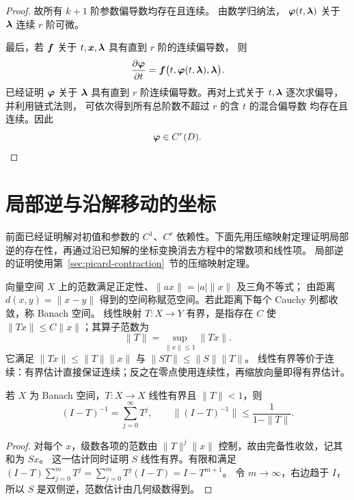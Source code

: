 \begin{proof}
	故所有 $k+1$ 阶参数偏导数均存在且连续。
	由数学归纳法，
	$\boldsymbol{\varphi}(t,\boldsymbol{\lambda})$ 关于
	$\boldsymbol{\lambda}$ 连续 $r$ 阶可微。
	
	最后，若 $\boldsymbol{f}$ 关于
	$t,\boldsymbol{x},\boldsymbol{\lambda}$ 具有直到 $r$ 阶的连续偏导数，
	则
	\[
	\frac{\partial\boldsymbol{\varphi}}{\partial t}
	=
	\boldsymbol{f}
	\bigl(
	t,\boldsymbol{\varphi}(t,\boldsymbol{\lambda}),\boldsymbol{\lambda}
	\bigr).
	\]
	已经证明 $\boldsymbol{\varphi}$ 关于 $\boldsymbol{\lambda}$
	具有直到 $r$ 阶连续偏导数。再对上式关于
	$t,\boldsymbol{\lambda}$ 逐次求偏导，并利用链式法则，
	可依次得到所有总阶数不超过 $r$ 的含 $t$ 的混合偏导数
	均存在且连续。因此
	\[
	\boldsymbol{\varphi}\in C^r(D).
	\]
\end{proof}

\section{局部逆与沿解移动的坐标}\label{sec:inverse-moving-coordinates}
前面已经证明解对初值和参数的 $C^1$、$C^r$ 依赖性。下面先用压缩映射定理证明局部逆的存在性，再通过沿已知解的坐标变换消去方程中的常数项和线性项。
局部逆的证明使用第~\ref{sec:picard-contraction}~节的压缩映射定理。

\begin{definition}\label{def:banach-operator}
向量空间 $X$ 上的范数满足正定性、$\|ax\|=|a|\|x\|$ 及三角不等式；
由距离 $d(x,y)=\|x-y\|$ 得到的空间称赋范空间。若此距离下每个 Cauchy 列都收敛，称 Banach 空间。
线性映射 $T:X\to Y$ 有界，是指存在 $C$ 使 $\|Tx\|\leq C\|x\|$；其算子范数为
\[
 \|T\|=\sup_{\|x\|\leq1}\|Tx\|.
\]
它满足 $\|Tx\|\leq\|T\|\|x\|$ 与 $\|ST\|\leq\|S\|\|T\|$。
线性有界等价于连续：有界估计直接保证连续；反之在零点使用连续性，再缩放向量即得有界估计。
\end{definition}
\begin{lemma}[Neumann 级数]\label{lem:neumann-series}
若 $X$ 为 Banach 空间，$T:X\to X$ 线性有界且 $\|T\|<1$，则
\[
 (I-T)^{-1}=\sum_{j=0}^\infty T^j,
 \qquad\|(I-T)^{-1}\|\leq\frac1{1-\|T\|}.
\]
\end{lemma}
\begin{proof}
对每个 $x$，级数各项的范数由 $\|T\|^j\|x\|$ 控制，故由完备性收敛，记其和为 $Sx$。
这一估计同时证明 $S$ 线性有界。有限和满足
$(I-T)\sum_{j=0}^mT^j=\sum_{j=0}^mT^j(I-T)=I-T^{m+1}$。
令 $m\to\infty$，右边趋于 $I$，所以 $S$ 是双侧逆，范数估计由几何级数得到。
\end{proof}

